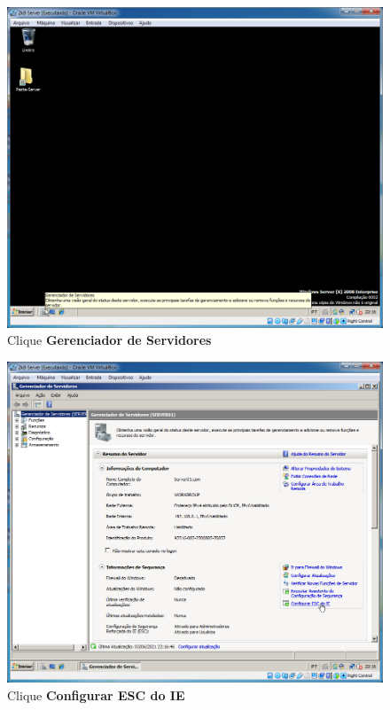 \documentclass[10pt]{article}
\begin{document}
\begin{figure}[H]
    \centering
    \caption{Clique \textbf{Gerenciador de Servidores}}
    \label{fig:re036}
    \includegraphics[width=\linewidth]{images/rede_externa/re036.png}
\end{figure}
\begin{figure}[H]
    \centering
    \caption{Clique \textbf{Configurar ESC do IE}}
    \label{fig:re037}
    \includegraphics[width=\linewidth]{images/rede_externa/re037.png}
\end{figure}
\end{document}
